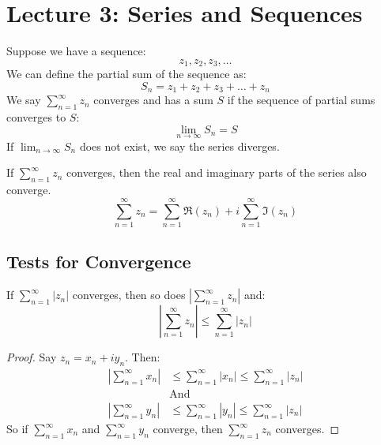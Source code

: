 \chapter{Lecture 3: Series and Sequences}

\begin{definition}
    Suppose we have a sequence:
    \begin{equation}
        z_1, z_2, z_3, \ldots
    \end{equation}
    We can define the partial sum of the sequence as:
    \begin{equation}
        S_n = z_1 + z_2 + z_3 + \ldots + z_n
    \end{equation}
    We say $\sum_{n=1}^{\infty} z_n$ converges and has a sum $S$ if the sequence of partial sums converges to $S$:
    \begin{equation}
        \lim_{n \to \infty} S_n = S
    \end{equation}
    If $\lim_{n \to \infty} S_n$ does not exist, we say the series diverges.
\end{definition}

\begin{corollary}
    If $\sum_{n=1}^{\infty} z_n$ converges, then the real and imaginary parts of the series also converge.
    \begin{equation}
        \sum_{n=1}^{\infty} z_n = \sum_{n=1}^{\infty} \Re(z_n) + i \sum_{n=1}^{\infty} \Im(z_n)
    \end{equation}
\end{corollary}

\section{Tests for Convergence}
\begin{theorem}
    If $\sum_{n=1}^{\infty} |z_n|$ converges, then so does $|\sum_{n=1}^{\infty} z_n|$ and:
    \[
        \left| \sum_{n=1}^{\infty} z_n \right| \leq \sum_{n=1}^{\infty} |z_n|
    \]
\end{theorem}

\begin{proof}
    Say $z_n = x_n + i y_n$. Then:
    \begin{align*}
        \left| \sum_{n=1}^{\infty} x_n \right| & \leq \sum_{n=1}^{\infty}  \left| x_n \right| \leq \sum_{n=1}^{\infty}  \left| z_n \right| \\
                                               & \text{And}                                                                                \\
        \left| \sum_{n=1}^{\infty} y_n \right| & \leq \sum_{n=1}^{\infty}  \left| y_n \right| \leq \sum_{n=1}^{\infty}  \left| z_n \right|
    \end{align*}
    So if $\sum_{n=1}^{\infty} x_n$ and $\sum_{n=1}^{\infty} y_n$ converge, then $\sum_{n=1}^{\infty} z_n$ converges.
\end{proof}

